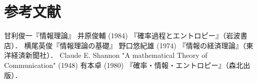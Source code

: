 \documentclass[uplatex,dvipdfmx]{jsreport}
\begin{document}
\chapter{参考文献}

\begin{thebibliography}{9}
    甘利俊一『情報理論』
    井原俊輔 (1984) 『確率過程とエントロピー』（岩波書店）．
    横尾英俊『情報理論の基礎』
    野口悠紀雄 (1974) 『情報の経済理論』（東洋経済新聞社）．
    Claude E. Shannon "A mathematical Theory of Communication" (1948)
    有本卓 (1980) 『確率・情報・エントロピー』（森北出版）．
\end{thebibliography}
\end{document}
